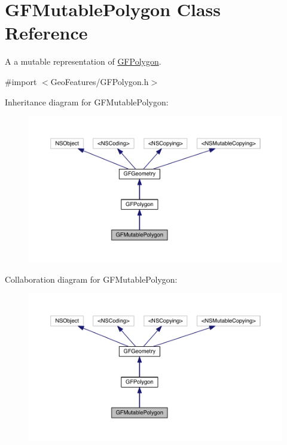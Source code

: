 \hypertarget{interface_g_f_mutable_polygon}{}\section{G\+F\+Mutable\+Polygon Class Reference}
\label{interface_g_f_mutable_polygon}


A a mutable representation of \hyperlink{interface_g_f_polygon}{G\+F\+Polygon}.  




{\ttfamily \#import $<$Geo\+Features/\+G\+F\+Polygon.\+h$>$}



Inheritance diagram for G\+F\+Mutable\+Polygon\+:
\nopagebreak
\begin{figure}[H]
\begin{center}
\leavevmode
\includegraphics[width=350pt]{interface_g_f_mutable_polygon__inherit__graph}
\end{center}
\end{figure}


Collaboration diagram for G\+F\+Mutable\+Polygon\+:
\nopagebreak
\begin{figure}[H]
\begin{center}
\leavevmode
\includegraphics[width=350pt]{interface_g_f_mutable_polygon__coll__graph}
\end{center}
\end{figure}
